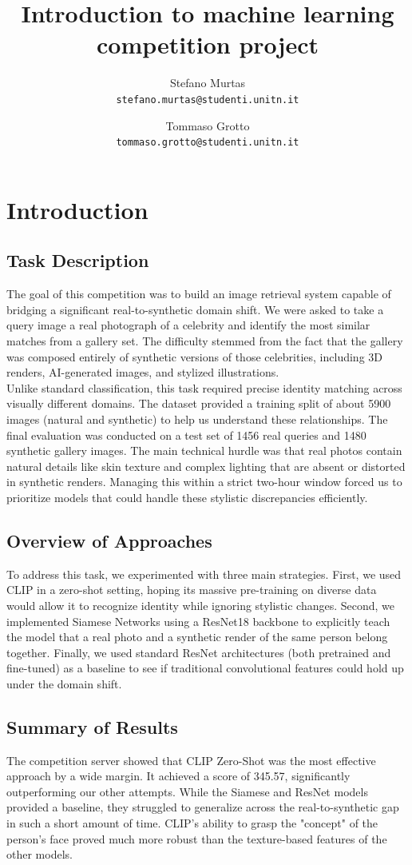 \documentclass[10pt,twocolumn,letterpaper]{article}
\title{Introduction to machine learning competition project}
\author{Stefano Murtas\\ \texttt{stefano.murtas@studenti.unitn.it}\\\and Tommaso Grotto\\\texttt{tommaso.grotto@studenti.unitn.it}\\}
\begin{document}
\maketitle
\section{Introduction}
\subsection{Task Description}
The goal of this competition was to build an image retrieval system capable of bridging a significant real-to-synthetic domain shift. We were asked to take a query image a real photograph of a celebrity and identify the most similar matches from a gallery set. The difficulty stemmed from the fact that the gallery was composed entirely of synthetic versions of those celebrities, including 3D renders, AI-generated images, and stylized illustrations.\\
Unlike standard classification, this task required precise identity matching across visually different domains. The dataset provided a training split of about 5900 images (natural and synthetic) to help us understand these relationships. The final evaluation was conducted on a test set of 1456 real queries and 1480 synthetic gallery images. The main technical hurdle was that real photos contain natural details like skin texture and complex lighting that are absent or distorted in synthetic renders. Managing this within a strict two-hour window forced us to prioritize models that could handle these stylistic discrepancies efficiently.
\subsection{Overview of Approaches}
To address this task, we experimented with three main strategies. First, we used CLIP in a zero-shot setting, hoping its massive pre-training on diverse data would allow it to recognize identity while ignoring stylistic changes. Second, we implemented Siamese Networks using a ResNet18 backbone to explicitly teach the model that a real photo and a synthetic render of the same person belong together. Finally, we used standard ResNet architectures (both pretrained and fine-tuned) as a baseline to see if traditional convolutional features could hold up under the domain shift.

\subsection{Summary of Results}
The competition server showed that CLIP Zero-Shot was the most effective approach by a wide margin. It achieved a score of 345.57, significantly outperforming our other attempts. While the Siamese and ResNet models provided a baseline, they struggled to generalize across the real-to-synthetic gap in such a short amount of time. CLIP's ability to grasp the "concept" of the person’s face proved much more robust than the texture-based features of the other models.
\end{document}
